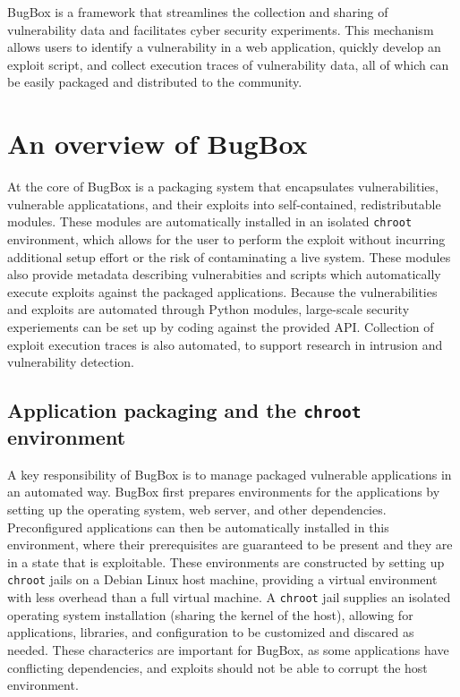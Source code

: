 \documentclass[letterpaper,twocolumn,10pt]{article}
\begin{document}
BugBox is a framework  that streamlines the collection and sharing of vulnerability data and facilitates cyber security experiments.  This mechanism allows users to identify a vulnerability in a web application, quickly develop an exploit script, and collect execution traces of vulnerability data, all of which can be easily packaged and distributed to the community.

\section{An overview of BugBox}

At the core of BugBox is a packaging system that encapsulates vulnerabilities, vulnerable applicatations, and their exploits into self-contained, redistributable modules. These modules are automatically installed in an isolated \texttt{chroot} environment, which allows for the user to perform the exploit without incurring additional setup effort or the risk of contaminating a live system. These modules also provide metadata describing vulnerabities and scripts which automatically execute exploits against the packaged applications. Because the vulnerabilities and exploits are automated through Python modules, large-scale security experiements can be set up by coding against the provided API. Collection of exploit execution traces is also automated, to support research in intrusion and vulnerability detection.
 
\subsection{Application packaging and the {\tt chroot} environment}

A key responsibility of BugBox is to manage packaged vulnerable applications in an automated way. BugBox first prepares environments for the applications by setting up the operating system, web server, and other dependencies. Preconfigured applications can then be automatically installed in this environment, where their prerequisites are guaranteed to be present and they are in a state that is exploitable. These environments are constructed by setting up {\tt chroot} jails on a Debian Linux host machine, providing a virtual environment with less overhead than a full virtual machine. A \texttt{chroot} jail supplies an isolated operating system installation (sharing the kernel of the host), allowing for applications, libraries, and configuration to be customized and discared as needed. These characterics are important for BugBox, as some applications have conflicting dependencies, and exploits should not be able to corrupt the host environment.
\end{document}
